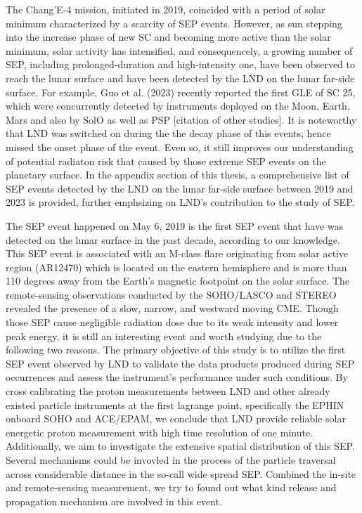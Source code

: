 


The Chang'E-4 mission, initiated in 2019, coincided with a period of solar minimum characterized by a scarcity of \ac{SEP} events. However, as sun stepping into the increase phase of new \ac{SC} and becoming more active than the solar minimum, solar activity has intensified, and consequencely, a growing number of \acs{SEP}, including prolonged-duration and high-intensity one, have been observed to reach the lunar surface and have been detected by the \ac{LND} on the lunar far-side surface. For example, Guo et al. (2023) recently reported the first \ac{GLE} of \ac{SC} 25, which were concurrently detected by instruments deployed on the Moon, Earth, Mars and also by \ac{SolO} as well as \ac{PSP} [citation of other studies]. It is noteworthy that \ac{LND} was switched on during the the decay phase of this events, hence missed the onset phase of the event. Even so, it still improves our understanding of potential radiaton risk that caused by those extreme \ac{SEP} events on the planetary surface.
In the appendix section of this thesis, a comprehensive list of \ac{SEP} events detected by the \ac{LND} on the lunar far-side surface between 2019 and 2023 is provided, further emphsizing on \ac{LND}'s contribution to the study of \acs{SEP}.


The \ac{SEP} event happened on May 6, 2019 is the first \ac{SEP} event that have was detected on the lunar surface in the past decade, according to our knowledge. 
This \ac{SEP} event is associated with an M-class flare originating from solar active region (AR12470) which is located on the eastern hemisphere and is more than 110 degrees away from the Earth's magnetic footpoint on the solar surface. The remote-sensing observations conducted by the \ac{SOHO}/\ac{LASCO} and \ac{STEREO} revealed the presence of a slow, narrow, and westward moving \ac{CME}. 
Though those \acs{SEP} cause negligible radiation dose due to its weak intensity and lower peak energy, it is still an interesting event and worth studying due to the following two reasons.
The primary objective of this study is to utilize the first \ac{SEP} event observed by \ac{LND} to validate the data products produced during \ac{SEP} occurrences and assess the instrument's performance under such conditions. By cross calibrating the proton measurements between \ac{LND} and other already existed particle instruments at the first lagrange point, specifically the \ac{EPHIN} onboard \ac{SOHO} and \ac{ACE}/\ac{EPAM}, we conclude that \ac{LND} provide reliable solar energetic proton measurement with high time resolution of one minute.
Additionally, we aim to investigate the extensive spatial distribution of this \ac{SEP}. Several mechanisms could be invovled in the process of the particle traversal across considerable distance in the so-call wide spread \acs{SEP}. Combined the in-site and remote-sensing measurement, we try to found out what kind release and propagation mechanism are involved in this event.


